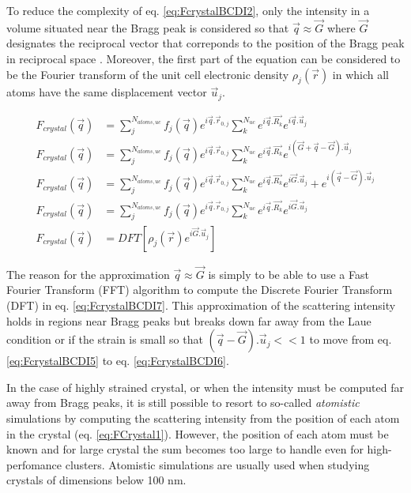 To reduce the complexity of eq. \ref{eq:FcrystalBCDI2}, only the intensity in a volume situated near the Bragg peak is considered so that $\vec{q} \approx \vec{G}$ where $\vec{G}$ designates the reciprocal vector that correponds to the position of the Bragg peak in reciprocal space \parencite{Pfeifer2006, Minkevich2007, Harder2007}.
Moreover, the first part of the equation can be considered to be the Fourier transform of the unit cell electronic density $\rho_j(\vec{r})$ in which all atoms have the same displacement vector $\vec{u}_j$.

\begin{align}
    \label{eq:FcrystalBCDI3}
    F_{crystal}(\vec{q}) & = \sum_j^{N_{atoms, uc}} f_j(\vec{q}) e^{i\vec{q}.\vec{r}_{0,j}} \sum_k^{N_{uc}} e^{i\vec{q}.\vec{R_k}} e^{i\vec{q}.\vec{u}_{j}}\\
    \label{eq:FcrystalBCDI4}
    F_{crystal}(\vec{q}) & = \sum_j^{N_{atoms, uc}} f_j(\vec{q}) e^{i\vec{q}.\vec{r}_{0,j}} \sum_k^{N_{uc}} e^{i\vec{q}.\vec{R_k}} e^{i(\vec{G}+\vec{q}-\vec{G}).\vec{u}_{j}}\\
    \label{eq:FcrystalBCDI5}
    F_{crystal}(\vec{q}) & = \sum_j^{N_{atoms, uc}} f_j(\vec{q}) e^{i\vec{q}.\vec{r}_{0,j}} \sum_k^{N_{uc}} e^{i\vec{q}.\vec{R_k}} e^{i\vec{G}.\vec{u}_{j}}+e^{i(\vec{q}-\vec{G}).\vec{u}_{j}}\\
    \label{eq:FcrystalBCDI6}
    F_{crystal}(\vec{q}) & = \sum_j^{N_{atoms, uc}} f_j(\vec{q}) e^{i\vec{q}.\vec{r}_{0,j}} \sum_k^{N_{uc}} e^{i\vec{q}.\vec{R_k}} e^{i\vec{G}.\vec{u}_{j}}\\
    \label{eq:FcrystalBCDI7}
    F_{crystal}(\vec{q}) & = DFT[\rho_j(\vec{r}) e^{i\vec{G}.\vec{u}_{j}}]
\end{align}

The reason for the approximation $\vec{q} \approx \vec{G}$ is simply to be able to use a Fast Fourier Transform (FFT) algorithm to compute the Discrete Fourier Transform (DFT) in eq. \ref{eq:FcrystalBCDI7}.
This approximation of the scattering intensity holds in regions near Bragg peaks but breaks down far away from the Laue condition or if the strain is small so that $(\vec{q}-\vec{G}).\vec{u}_{j}<<1$ to move from eq. \ref{eq:FcrystalBCDI5} to eq. \ref{eq:FcrystalBCDI6}.

In the case of highly strained crystal, or when the intensity must be computed far away from Bragg peaks, it is still possible to resort to so-called \textit{atomistic} simulations by computing the scattering intensity from the position of each atom in the crystal (eq. \ref{eq:FCrystal1}).
However, the position of each atom must be known and for large crystal the sum becomes too large to handle even for high-perfomance clusters.
Atomistic simulations are usually used when studying crystals of dimensions below 100 nm.

